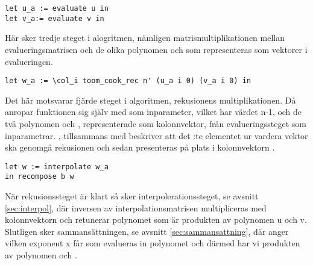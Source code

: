 \begin{lstlisting}
let u_a := evaluate u in
let v_a:= evaluate v in
\end{lstlisting}

Här sker tredje steget i alogritmen, nämligen matrismultiplikationen mellan
evalueringsmatrisen och de olika polynomen  och  som representeras
som vektorer i evalueringen.

\begin{lstlisting}
let w_a := \col_i toom_cook_rec n' (u_a i 0) (v_a i 0) in
\end{lstlisting}

Det här motsvarar fjärde steget i algoritmen, rekusionens multiplikationen. Då
anropar funktionen  sig själv med  som inparameter, vilket
har värdet n-1, och de två polynomen  och , representerade som
kolonnvektor, från evalueringssteget som inparametrar. ,  tillsammans med  beskriver att det :te elementet ur
vardera vektor ska genomgå rekusionen och sedan presenteras på plats  i
kolonnvektorn .

\begin{lstlisting}
let w := interpolate w_a
in recompose b w
\end{lstlisting}

När rekusionssteget är klart så sker interpolerationssteget, se avsnitt
\ref{sec:interpol}, där inversen av interpolationsmatrisen multipliceras med
kolonnvektorn  och retunerar polynomet  som är produkten av
polynomen u och v. Slutligen sker sammansättningen, se avsnitt
\ref{sec:sammansattning}, där  anger vilken exponent x får som evalueras in
polynomet  och därmed har vi produkten av polynomen  och .
